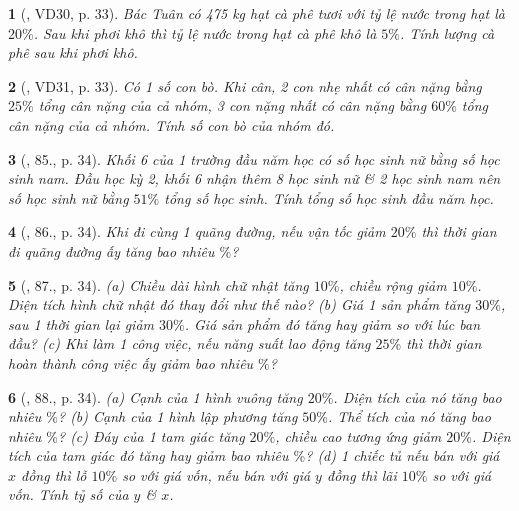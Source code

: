 \documentclass{article}
\newtheorem{baitoan}{}
\begin{document}
\begin{baitoan}[\cite{Binh_Toan_6_tap_2}, VD30, p. 33]
	Bác Tuân có {\rm475 kg} hạt cà phê tươi với tỷ lệ nước trong hạt là $20\%$. Sau khi phơi khô thì tỷ lệ nước trong hạt cà phê khô là $5\%$. Tính lượng cà phê sau khi phơi khô.
\end{baitoan}

\begin{baitoan}[\cite{Binh_Toan_6_tap_2}, VD31, p. 33]
	Có 1 số con bò. Khi cân, 2 con nhẹ nhất có cân nặng bằng $25\%$ tổng cân nặng của cả nhóm, 3 con nặng nhất có cân nặng bằng $60\%$ tổng cân nặng của cả nhóm. Tính số con bò của nhóm đó.
\end{baitoan}

\begin{baitoan}[\cite{Binh_Toan_6_tap_2}, 85., p. 34]
	Khối 6 của 1 trường đầu năm học có số học sinh nữ bằng số học sinh nam. Đầu học kỳ 2, khối 6 nhận thêm 8 học sinh nữ \& 2 học sinh nam nên số học sinh nữ bằng $51\%$ tổng số học sinh. Tính tổng số học sinh đầu năm học.
\end{baitoan}

\begin{baitoan}[\cite{Binh_Toan_6_tap_2}, 86., p. 34]
	Khi đi cùng 1 quãng đường, nếu vận tốc giảm $20\%$ thì thời gian đi quãng đường ấy tăng bao nhiêu $\%$?
\end{baitoan}

\begin{baitoan}[\cite{Binh_Toan_6_tap_2}, 87., p. 34]
	(a) Chiều dài hình chữ nhật tăng $10\%$, chiều rộng giảm $10\%$. Diện tích hình chữ nhật đó thay đổi như thế nào? (b) Giá 1 sản phẩm tăng $30\%$, sau 1 thời gian lại giảm $30\%$. Giá sản phẩm đó tăng hay giảm so với lúc ban đầu? (c) Khi làm 1 công việc, nếu năng suất lao động tăng $25\%$ thì thời gian hoàn thành công việc ấy giảm bao nhiêu $\%$?
\end{baitoan}

\begin{baitoan}[\cite{Binh_Toan_6_tap_2}, 88., p. 34]
	(a) Cạnh của 1 hình vuông tăng $20\%$. Diện tích của nó tăng bao nhiêu $\%$? (b) Cạnh của 1 hình lập phương tăng $50\%$. Thể tích của nó tăng bao nhiêu $\%$? (c) Đáy của 1 tam giác tăng $20\%$, chiều cao tương ứng giảm $20\%$. Diện tích của tam giác đó tăng hay giảm bao nhiêu $\%$? (d) 1 chiếc tủ nếu bán với giá $x$ đồng thì lỗ $10\%$ so với giá vốn, nếu bán với giá $y$ đồng thì lãi $10\%$ so với giá vốn. Tính tỷ số của $y$ \& $x$.
\end{baitoan}
\end{document}
